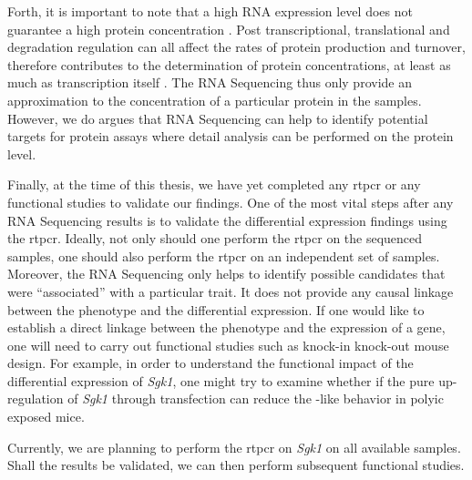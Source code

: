 Forth, it is important to note that a high RNA expression level does not guarantee a high protein concentration \citep{Vogel2012}.
Post transcriptional, translational and degradation regulation can all affect the rates of protein production and turnover, therefore contributes to the determination of protein concentrations, at least as much as transcription itself \citep{Vogel2012}.
The RNA Sequencing thus only provide an approximation to the concentration of a particular protein in the samples.
However, we do argues that RNA Sequencing can help to identify potential targets for protein assays where detail analysis can be performed on the protein level.

Finally, at the time of this thesis, we have yet completed any \gls{rtpcr} or any functional studies to validate our findings.
One of the most vital steps after any RNA Sequencing results is to validate the differential expression findings using the \gls{rtpcr}.
Ideally, not only should one perform the \gls{rtpcr} on the sequenced samples, one should also perform the \gls{rtpcr} on an independent set of samples. 
Moreover, the RNA Sequencing only helps to identify possible candidates that were ``associated'' with a particular trait.
It does not provide any causal linkage between the phenotype and the differential expression.
If one would like to establish a direct linkage between the phenotype and the expression of a gene, one will need to carry out functional studies such as knock-in knock-out mouse design.
For example, in order to understand the functional impact of the differential expression of \textit{Sgk1}, one might try to examine whether if the pure up-regulation of \textit{Sgk1} through transfection can reduce the -like behavior in \gls{polyic} exposed mice.

Currently, we are planning to perform the \gls{rtpcr} on \textit{Sgk1} on all available samples. 
Shall the results be validated, we can then perform subsequent functional studies. 

\newpage
